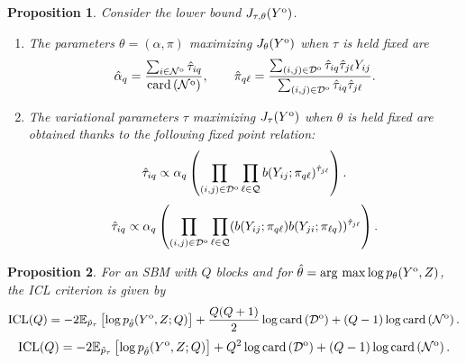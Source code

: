 \documentclass[10pt]{article}
\newcommand{\1}{\mathds{1}}
\newcommand{\MA}{Y}
\newcommand{\MAO}{\MA^\text{\rm o}}
\newcommand{\card}[1]{\text{\rm card}\left(#1\right)}
\newcommand{\block}{\mathcal{Q}}
\newcommand{\dyad}{\mathcal{D}}
\newcommand{\dyadO}{\dyad^\text{\rm o}}
\newcommand{\node}{\mathcal{N}}
\newcommand{\nodeO}{\node^\text{\rm o}}
\newcommand{\argmax}{\mathop{\mathrm{arg\ max}}}
\newtheorem{proposition}{Proposition}
\begin{document}
\begin{proposition} Consider  the lower  bound $J_{\tau,\theta}(\MAO)$.
  \begin{enumerate}
  \item   The  parameters $\theta=(\alpha,  \pi)$ maximizing  $J_\theta(\MAO)$
    when $\tau$ is held fixed are
    \begin{equation}\nonumber
      \hat{\alpha}_q=\frac{\sum_{i\in \nodeO}\hat{\tau}_{iq}}{\card{\nodeO}}, \qquad
      \hat{\pi}_{q\ell}=\frac{\sum_{(i,j)\in
          \dyadO}\hat{\tau}_{iq}\hat{\tau}_{j\ell}\MA_{ij}}{\sum_{(i,j)\in
          \dyadO
        }\hat{\tau}_{iq}\hat{\tau}_{j\ell}}.
    \end{equation}
  \item   The  variational parameters  $\tau$  maximizing $J_\tau(\MAO)$  when
    $\theta$ is held fixed are obtained thanks to the following fixed point relation:
    \begin{equation}\nonumber
      \hat{\tau}_{iq}\propto \alpha_{q} \left( \prod_{(i,j)\in\dyadO}
        \prod_{\ell\in\block} b(\MA_{ij}; \pi_{q\ell})^{\hat{\tau}_{j\ell}}\right).
    \end{equation}
        \textcolor{red}{    \begin{equation}\nonumber
      \hat{\tau}_{iq}\propto \alpha_{q} \left( \prod_{(i,j)\in\dyadO}
        \prod_{\ell\in\block} (b(\MA_{ij}; \pi_{q\ell})b(\MA_{ji}; \pi_{\ell q}))^{\hat{\tau}_{j\ell}}\right).
    \end{equation}}
  \end{enumerate}
\end{proposition}

\begin{proposition}
\label{prop:ICL_MAR}
  For      an      SBM      with     $Q$      blocks      and      for
  $\hat{\theta}=\argmax \log p_{\theta}(\MAO,Z)$, the ICL criterion is
  given by
  \begin{equation}\nonumber
    \mathrm{ICL}(Q)   =    -2   \mathbb{E}_{\tilde   p_\tau}\left[\log
      p_{\hat\theta}(\MAO,  Z   ;  Q)\right]   +  \frac{Q(Q+1)}{2}\log
    \card{\dyadO} + (Q-1)\log \card{\nodeO}. 
  \end{equation}
  \textcolor{red}{  \begin{equation}\nonumber
    \mathrm{ICL}(Q)   =    -2   \mathbb{E}_{\tilde   p_\tau}\left[\log
      p_{\hat\theta}(\MAO,  Z   ;  Q)\right]   +  Q^2\log
    \card{\dyadO} + (Q-1)\log \card{\nodeO}. 
  \end{equation}}
\end{proposition}
\end{document}

